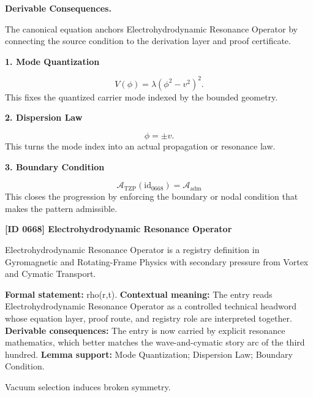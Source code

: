 \par\vspace{0.35em}
\noindent\textbf{Derivable Consequences.}\quad
\begingroup
\footnotesize
\raggedright
The canonical equation anchors Electrohydrodynamic Resonance Operator by connecting the source condition to the derivation layer and proof certificate.
\par\endgroup

\noindent\textbf{1. Mode Quantization}\par
\[
V(\phi) = \lambda(\phi^2 - v^2)^2.
\]
\noindent This fixes the quantized carrier mode indexed by the bounded geometry.\par
\noindent\textbf{2. Dispersion Law}\par
\[
\phi = \pm v.
\]
\noindent This turns the mode index into an actual propagation or resonance law.\par
\noindent\textbf{3. Boundary Condition}\par
\[
\mathcal{A}_{\mathrm{TZP}}(\mathrm{id}_{0668})=\mathcal{A}_{\mathrm{adm}}
\]
\noindent This closes the progression by enforcing the boundary or nodal condition that makes the pattern admissible.\par

\clearpage
\noindent\textbf{[ID 0668] Electrohydrodynamic Resonance Operator}\par
\vspace{0.35em}
\begingroup\small
{}
Electrohydrodynamic Resonance Operator is a registry definition in Gyromagnetic and Rotating-Frame Physics with secondary pressure from Vortex and Cymatic Transport.

\begingroup\footnotesize\setlength{\emergencystretch}{3em}\sloppy
\textbf{Formal statement:} rho(r,t). \textbf{Contextual meaning:} The entry reads Electrohydrodynamic Resonance Operator as a controlled technical headword whose equation layer, proof route, and registry role are interpreted together. \textbf{Derivable consequences:} The entry is now carried by explicit resonance mathematics, which better matches the wave-and-cymatic story arc of the third hundred. \textbf{Lemma support:} Mode Quantization; Dispersion Law; Boundary Condition.\par
\endgroup

Vacuum selection induces broken symmetry.

